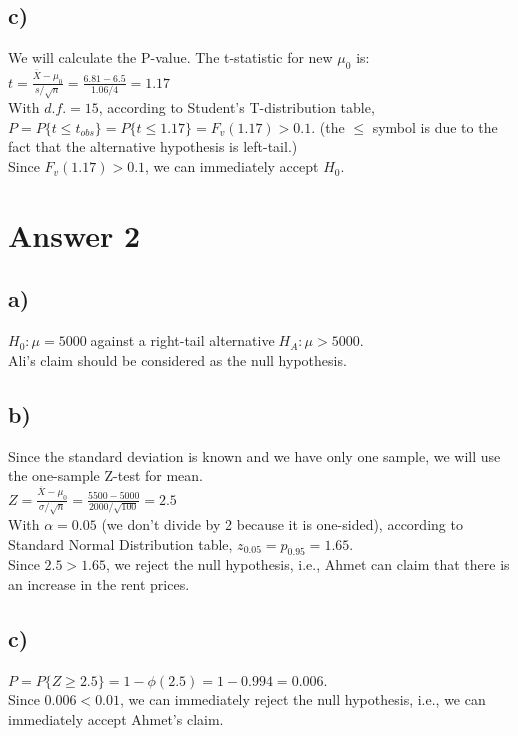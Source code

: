 \documentclass{article}
\begin{document}
\subsection*{c)}
We will calculate the P-value. The t-statistic for new $\mu_0$ is:\vspace{0.2cm}\\
$t = \frac{\overline{X}-\mu_0}{s/\sqrt{n}} = \frac{6.81-6.5}{1.06/4} = 1.17$\vspace{0.2cm}\\
With $d.f. = 15$, according to Student's T-distribution table, $P = P\{t \leq t_{obs}\} = P\{t \leq 1.17\} = F_v(1.17) > 0.1$. (the $\leq$ symbol is due to the fact that the alternative hypothesis is left-tail.)\vspace{0.2cm}\\
Since $F_v(1.17) > 0.1$, we can immediately accept $H_0$.

\section*{Answer 2}
\subsection*{a)}
$H_0: \mu = 5000\;$against a right-tail alternative$\; H_A: \mu > 5000.$\\
Ali's claim should be considered as the null hypothesis.
\subsection*{b)}
Since the standard deviation is known and we have only one sample, we will use the one-sample Z-test for mean.\vspace{0.2cm}\\
$Z = \frac{\overline{X}-\mu_0}{\sigma/\sqrt{n}} = \frac{5500-5000}{2000/\sqrt{100}} = 2.5$\vspace{0.2cm}\\
With $\alpha = 0.05$ (we don't divide by 2 because it is one-sided), according to Standard Normal Distribution table, $z_{0.05} = p_{0.95} = 1.65$.\vspace{0.2cm}\\
Since $2.5 > 1.65$, we reject the null hypothesis, i.e., Ahmet can claim that there is an increase in the rent prices.
\subsection*{c)}
$P = P\{Z \geq 2.5\} = 1 - \phi(2.5) = 1 - 0.994 = 0.006$.\vspace{0.2cm}\\
Since $0.006 < 0.01$, we can immediately reject the null hypothesis, i.e., we can immediately accept Ahmet's claim.
\end{document}

